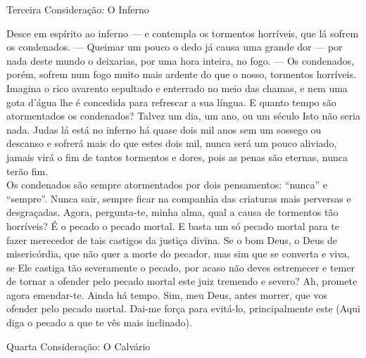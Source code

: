 \begin{center}
    \textcolor{VioletRed2}{Terceira Consideração: O Inferno}
\end{center}
\begin{flushleft}
    Desce em espírito ao inferno --- e contempla os tormentos horríveis, que lá sofrem os condenados. --- Queimar um pouco o dedo já causa uma grande dor --- por nada deste mundo o deixarias, por uma hora inteira, no fogo. --- Os condenados, porém, sofrem num fogo muito mais ardente do que o nosso, tormentos horríveis. Imagina o rico avarento sepultado e enterrado no meio das chamas, e nem uma gota d'água lhe é concedida para refrescar a sua língua. E quanto tempo são atormentados os condenados? Talvez um dia, um ano, ou um século Isto não seria nada. Judas lá está no inferno há quase dois mil anos sem um sossego ou descanso e sofrerá mais do que estes dois mil, nunca será um pouco aliviado, jamais virá o fim de tantos tormentos e dores, pois as penas são eternas, nunca terão fim.
    \vspace{.2cm} \\
    Os condenados são sempre atormentados por dois pensamentos: ``nunca'' e ``sempre''. Nunca sair, sempre ficar na companhia das criaturas mais perversas e desgraçadas. Agora, pergunta-te, minha alma, qual a causa de tormentos tão horríveis? É o pecado o pecado mortal. E basta um só pecado mortal para te fazer merecedor de tais castigos da justiça divina. Se o bom Deus, o Deus de misericórdia, que não quer a morte do pecador, mas sim que se converta e viva, se Ele castiga tão severamente o pecado, por acaso não deves estremecer e temer de tornar a ofender pelo pecado mortal este juiz tremendo e severo? Ah, promete agora emendar-te. Ainda há tempo. Sim, meu Deus, antes morrer, que vos ofender pelo pecado mortal. Dai-me força para evitá-lo, principalmente este \textcolor{VioletRed2}{(Aqui diga o pecado a que te vês mais inclinado)}.
\end{flushleft}
\newpage
\begin{center}
    \textcolor{VioletRed2}{Quarta Consideração: O Calvário}
\end{center}
